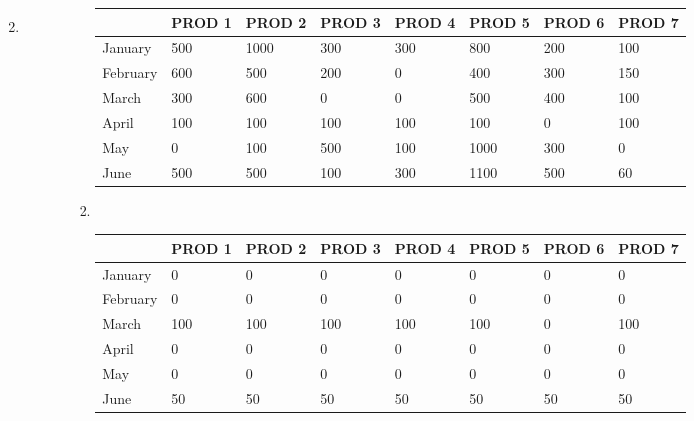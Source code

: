 \documentclass[12pt,a4paper]{article}
\makeatletter
\newtheorem*{solution}{Solution}
\theoremstyle{definition}
\renewenvironment{solution}[1][Solution] {\par\pushQED{\qed}\normalfont\topsep6\p@\@plus6\p@\relax\trivlist\item[\hskip\labelsep\bfseries#1\@addpunct{.}]\ignorespaces}{\popQED\endtrivlist\@endpefalse} \makeatother
\makeatother
\begin{document}
\begin{enumerate}
\begin{solution}
\begin{enumerate}
\begin{enumerate}
\begin{enumerate}
\begin{table}[htbp]
              \begin{tabular}{m{} m{}<{\centering} m{}<{\centering} m{}<{\centering} m{}<{\centering} m{}<{\centering} m{}<{\centering} m{}<{\centering}}
              \hline
               & \textbf{PROD 1} & \textbf{PROD 2} & \textbf{PROD 3} & \textbf{PROD 4} & \textbf{PROD 5} & \textbf{PROD 6} &  \textbf{PROD 7} \\\hline
              January & 500 & 1000 & 300 & 300 & 800 & 200 & 100 \\
              February & 600 & 500 & 200 & 0 & 400 & 300 & 150 \\
              March & 300 & 600 & 0 & 0 & 500 & 400 & 100 \\
              April & 100 & 100 & 100 & 100 & 100 & 0 & 100 \\
              May & 0 & 100 & 500 & 100 & 1000 & 300 & 0 \\
              June & 500 & 500 & 100 & 300 & 1100 & 500 & 60 \\
              \hline
              \end{tabular}
            \end{table}
            \item 
            ~
                \begin{table}[!htbp]
              \scriptsize
              \centering
              \renewcommand\arraystretch{1.1}
              \begin{tabular}{m{} m{}<{\centering} m{}<{\centering} m{}<{\centering} m{}<{\centering} m{}<{\centering} m{}<{\centering} m{}<{\centering}}
              \hline
               & \textbf{PROD 1} & \textbf{PROD 2} & \textbf{PROD 3} & \textbf{PROD 4} & \textbf{PROD 5} & \textbf{PROD 6} &  \textbf{PROD 7} \\\hline
              January & 0 & 0 & 0 & 0 & 0 & 0 & 0 \\
              February & 0 & 0 & 0 & 0 & 0 & 0 & 0 \\
              March & 100 & 100 & 100 & 100 & 100 & 0 & 100 \\
              April & 0 & 0 & 0 & 0 & 0 & 0 & 0 \\
              May & 0 & 0 & 0 & 0 & 0 & 0 & 0 \\
              June & 50 & 50 & 50 & 50 & 50 & 50 & 50 \\
              \hline
              \end{tabular}
            \end{table}
            

\end{enumerate}
\end{enumerate}
\end{enumerate}
\end{solution}
\end{enumerate}
\end{document}
